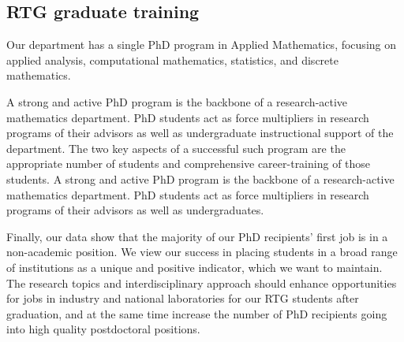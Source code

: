 \documentclass[11pt]{NSFamsart}
\begin{document}
\subsection{RTG graduate training }

 
Our department has a single PhD program in Applied  Mathematics, focusing    on applied analysis,     computational mathematics,    statistics, and discrete mathematics. 

A strong and active PhD program is the backbone of a research-active mathematics department. PhD students act as force multipliers in research programs of their advisors as well as undergraduate instructional support of the department. The two key aspects of a successful such program are the appropriate number of students and comprehensive career-training of those students.
A strong and active PhD program is the backbone of a research-active mathematics department. PhD students act as force multipliers in research programs of their advisors as well as undergraduates.


Finally, our data show that the majority of our PhD recipients’ first job is in a non-academic position.
We view our success in placing students in a broad range of institutions as a unique and positive indicator,
which we want to maintain. The research topics and interdisciplinary approach should enhance opportunities
for jobs in industry and national laboratories for our RTG students after graduation, and at the same time
increase the number of PhD recipients going into high quality postdoctoral positions.
\end{document}

